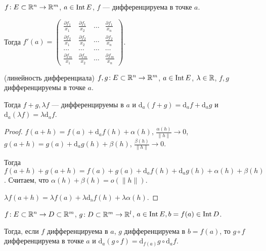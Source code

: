 \begin{consequence}
    $f\!: E \subset \mathbb{R}^n \to \mathbb{R}^m$,  $a \in \operatorname{Int} E$,  $f$ --- дифференцируема в точке  $a$.

    Тогда  $f'(a) = \begin{pmatrix} \frac{\partial f_1}{x_1} & \frac{\partial f_1}{x_2} & \ldots & \frac{\partial f_1}{x_n}\\  \frac{\partial f_2}{x_1} &\frac{\partial f_2}{x_2} & \ldots &\frac{\partial f_2}{x_n}\\ \ldots & \ldots & \ldots & \ldots\\ \frac{\partial f_m}{x_1} & \frac{\partial f_m}{x_2} & \ldots & \frac{\partial f_m}{x_n} \end{pmatrix}$.
\end{consequence}
\begin{theorem}(линейность дифференциала)
    $f, g\!: E \subset \mathbb{R}^n \to \mathbb{R}^m$,  $a \in \operatorname{Int} E$,  $\lambda \in \mathbb{R}$, $f, g$ дифференцируемы в точке $a$.

    Тогда $f + g, \lambda f$ --- дифференцируемы в  $a$ и $\mathrm{d}_a(f+g) = \mathrm{d}_af + \mathrm{d}_ag $ и $\mathrm{d}_a(\lambda f) = \lambda \mathrm{d}_a f$.
\end{theorem}
\begin{proof}
    $f(a+h) = f(a) + \mathrm{d}_af(h) + \alpha(h)$, $\frac{\alpha(h)}{\|h\|} \to 0$, $g(a + h) = g(a) + \mathrm{d}_ag(h) + \beta(h)$, $\frac{\beta(h)}{\|h\|} \to 0$.

    Тогда $f(a+h) + g(a+h) = f(a) + g(a) + \mathrm{d}_af(h) + \mathrm{d}_ag(h) + \alpha(h) + \beta(h)$. Считаем, что  $\alpha(h) + \beta(h) = o(\|h\|)$.

     $\lambda f(a+h) = \lambda f(a) + \lambda \mathrm{d_a}f(h) + \lambda\alpha(h)$.
\end{proof}
\begin{theorem}
    $f\!: E \subset \mathbb{R}^n \to D \subset \mathbb{R}^m$, $g\!: D \subset \mathbb{R}^m \to \mathbb{R}^l$,  $a \in \operatorname{Int} E, b = f(a) \in \operatorname{Int} D$.

    Тогда, если  $f$ дифференцируема в  $a$,  $g$ дифференцируема в  $b = f(a)$, то  $g \circ f$ дифференцируема в точке  $a$ и  $\mathrm{d}_a(g \circ f) = \mathrm{d}_{f(a)}g \circ \mathrm{d}_af$.
\end{theorem}
